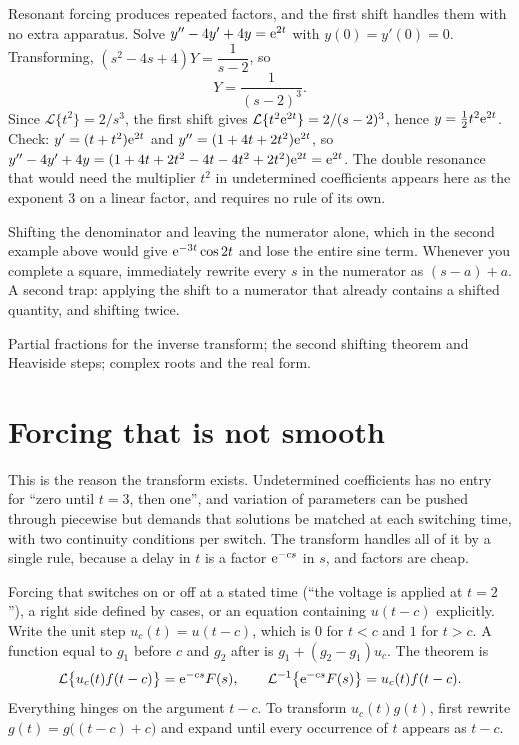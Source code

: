 \begin{worked}
Resonant forcing produces repeated factors, and the first shift handles them with no extra apparatus. Solve $y''-4y'+4y=\mathrm{e}^{2t}$ with $y(0)=y'(0)=0$. Transforming, $(s^{2}-4s+4)Y=\dfrac1{s-2}$, so
\[Y=\frac{1}{(s-2)^{3}}.\]
Since $\mathcal{L}\{t^{2}\}=2/s^{3}$, the first shift gives $\mathcal{L}\{t^{2}\mathrm{e}^{2t}\}=2/(s-2)^{3}$, hence $y=\tfrac12t^{2}\mathrm{e}^{2t}$. Check: $y'=(t+t^{2})\mathrm{e}^{2t}$ and $y''=(1+4t+2t^{2})\mathrm{e}^{2t}$, so $y''-4y'+4y=(1+4t+2t^{2}-4t-4t^{2}+2t^{2})\mathrm{e}^{2t}=\mathrm{e}^{2t}$. The double resonance that would need the multiplier $t^{2}$ in undetermined coefficients appears here as the exponent $3$ on a linear factor, and requires no rule of its own.
\end{worked}

\begin{trap}
Shifting the denominator and leaving the numerator alone, which in the second example above would give $\mathrm{e}^{-3t}\cos2t$ and lose the entire sine term. Whenever you complete a square, immediately rewrite every $s$ in the numerator as $(s-a)+a$. A second trap: applying the shift to a numerator that already contains a shifted quantity, and shifting twice.
\end{trap}

\begin{seealsob}Partial fractions for the inverse transform; the second shifting theorem and Heaviside steps; complex roots and the real form.\end{seealsob}

\section{Forcing that is not smooth}

This is the reason the transform exists. Undetermined coefficients has no entry for ``zero until $t=3$, then one'', and variation of parameters can be pushed through piecewise but demands that solutions be matched at each switching time, with two continuity conditions per switch. The transform handles all of it by a single rule, because a delay in $t$ is a factor $\mathrm{e}^{-cs}$ in $s$, and factors are cheap.

\cue Forcing that switches on or off at a stated time (``the voltage is applied at $t=2$''), a right side defined by cases, or an equation containing $u(t-c)$ explicitly.
\method Write the unit step $u_c(t)=u(t-c)$, which is $0$ for $t<c$ and $1$ for $t>c$. A function equal to $g_1$ before $c$ and $g_2$ after is $g_1+(g_2-g_1)u_c$. The theorem is
\[\mathcal{L}\bigl\{u_c(t)f(t-c)\bigr\}=\mathrm{e}^{-cs}F(s),\qquad
\mathcal{L}^{-1}\bigl\{\mathrm{e}^{-cs}F(s)\bigr\}=u_c(t)f(t-c).\]
Everything hinges on the argument $t-c$. To transform $u_c(t)g(t)$, first rewrite $g(t)=g\bigl((t-c)+c\bigr)$ and expand until every occurrence of $t$ appears as $t-c$.

